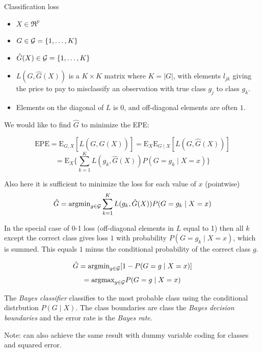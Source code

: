\documentclass[
  ignorenonframetext,
]{beamer}
\providecommand{\tightlist}{%
  \setlength{\itemsep}{0pt}\setlength{\parskip}{0pt}}
\begin{document}
\begin{frame}

\begin{block}{Classification loss}

\begin{itemize}
\tightlist
\item
  \(X \in \Re^p\)
\item
  \(G \in {\cal G}=\{1,\ldots,K\}\)
\item
  \(\hat{G}(X) \in {\cal G}=\{1,\ldots,K\}\)
\item
  \(L(G,\hat{G}(X))\) is a \(K\times K\) matrix where
  \(K=\lvert G \rvert\), with elements \(l_{jk}\) giving the price to
  pay to misclassify an observation with true class \(g_j\) to class
  \(g_k\).
\item
  Elements on the diagonal of \(L\) is 0, and off-diagonal elements are
  often \(1\).
\end{itemize}

We would like to find \(\hat{G}\) to minimize the EPE:

\[\text{EPE}=\text{E}_{G,X}[L(G,\hat{G}(X))]=\text{E}_X \text{E}_{G\mid X}[L(G,\hat{G}(X))]\]
\[=\text{E}_X \{ \sum_{k=1}^K L(g_k,\hat{G}(X))P(G=g_k \mid X=x) \} \]

\end{block}

\end{frame}

\begin{frame}

Also here it is sufficient to minimize the loss for each value of \(x\)
(pointwise)
\[ \hat{G}=\text{argmin}_{g \in {\cal G}}\sum_{k=1}^K L(g_k,\hat{G}(X))P(G=g_k \mid X=x) \]

In the special case of 0-1 loss (off-diagonal elements in \(L\) equal to
1) then all \(k\) except the correct class gives loss \(1\) with
probability \(P(G=g_k \mid X=x)\), which is summed. This equals \(1\)
minus the conditional probability of the correct class \(g\).

\end{frame}

\begin{frame}

\[\hat{G}=\text{argmin}_{g \in {\cal G}} [1-P(G=g \mid X=x)]\]
\[=\text{argmax}_{g \in {\cal G}}P(G=g \mid X=x)\]

The \emph{Bayes classifier} classifies to the most probable class using
the conditional distrbution \(P(G \mid X)\). The class boundaries are
class the \emph{Bayes decision boundaries} and the error rate is the
\emph{Bayes rate}.

Note: can also achieve the same result with dummy variable coding for
classes and squared error.

\end{frame}
\end{document}
